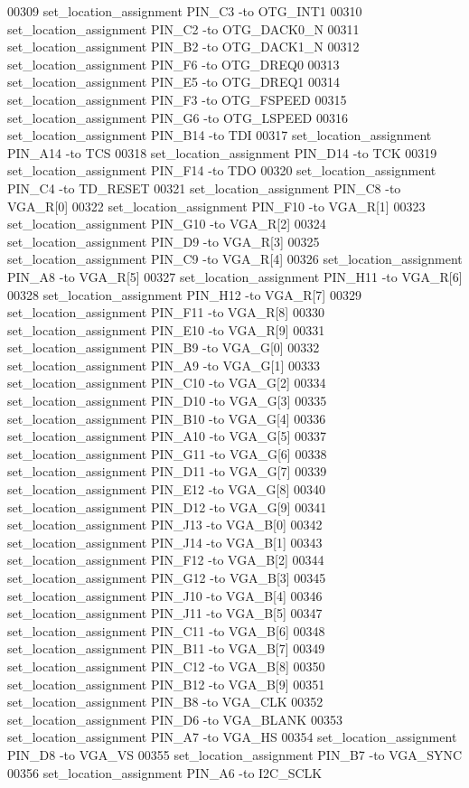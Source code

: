 \begin{DoxyCode}
00309 set\_location\_assignment PIN\_C3 -to OTG\_INT1
00310 set\_location\_assignment PIN\_C2 -to OTG\_DACK0\_N
00311 set\_location\_assignment PIN\_B2 -to OTG\_DACK1\_N
00312 set\_location\_assignment PIN\_F6 -to OTG\_DREQ0
00313 set\_location\_assignment PIN\_E5 -to OTG\_DREQ1
00314 set\_location\_assignment PIN\_F3 -to OTG\_FSPEED
00315 set\_location\_assignment PIN\_G6 -to OTG\_LSPEED
00316 set\_location\_assignment PIN\_B14 -to TDI
00317 set\_location\_assignment PIN\_A14 -to TCS
00318 set\_location\_assignment PIN\_D14 -to TCK
00319 set\_location\_assignment PIN\_F14 -to TDO
00320 set\_location\_assignment PIN\_C4 -to TD\_RESET
00321 set\_location\_assignment PIN\_C8 -to VGA\_R[0]
00322 set\_location\_assignment PIN\_F10 -to VGA\_R[1]
00323 set\_location\_assignment PIN\_G10 -to VGA\_R[2]
00324 set\_location\_assignment PIN\_D9 -to VGA\_R[3]
00325 set\_location\_assignment PIN\_C9 -to VGA\_R[4]
00326 set\_location\_assignment PIN\_A8 -to VGA\_R[5]
00327 set\_location\_assignment PIN\_H11 -to VGA\_R[6]
00328 set\_location\_assignment PIN\_H12 -to VGA\_R[7]
00329 set\_location\_assignment PIN\_F11 -to VGA\_R[8]
00330 set\_location\_assignment PIN\_E10 -to VGA\_R[9]
00331 set\_location\_assignment PIN\_B9 -to VGA\_G[0]
00332 set\_location\_assignment PIN\_A9 -to VGA\_G[1]
00333 set\_location\_assignment PIN\_C10 -to VGA\_G[2]
00334 set\_location\_assignment PIN\_D10 -to VGA\_G[3]
00335 set\_location\_assignment PIN\_B10 -to VGA\_G[4]
00336 set\_location\_assignment PIN\_A10 -to VGA\_G[5]
00337 set\_location\_assignment PIN\_G11 -to VGA\_G[6]
00338 set\_location\_assignment PIN\_D11 -to VGA\_G[7]
00339 set\_location\_assignment PIN\_E12 -to VGA\_G[8]
00340 set\_location\_assignment PIN\_D12 -to VGA\_G[9]
00341 set\_location\_assignment PIN\_J13 -to VGA\_B[0]
00342 set\_location\_assignment PIN\_J14 -to VGA\_B[1]
00343 set\_location\_assignment PIN\_F12 -to VGA\_B[2]
00344 set\_location\_assignment PIN\_G12 -to VGA\_B[3]
00345 set\_location\_assignment PIN\_J10 -to VGA\_B[4]
00346 set\_location\_assignment PIN\_J11 -to VGA\_B[5]
00347 set\_location\_assignment PIN\_C11 -to VGA\_B[6]
00348 set\_location\_assignment PIN\_B11 -to VGA\_B[7]
00349 set\_location\_assignment PIN\_C12 -to VGA\_B[8]
00350 set\_location\_assignment PIN\_B12 -to VGA\_B[9]
00351 set\_location\_assignment PIN\_B8 -to VGA\_CLK
00352 set\_location\_assignment PIN\_D6 -to VGA\_BLANK
00353 set\_location\_assignment PIN\_A7 -to VGA\_HS
00354 set\_location\_assignment PIN\_D8 -to VGA\_VS
00355 set\_location\_assignment PIN\_B7 -to VGA\_SYNC
00356 set\_location\_assignment PIN\_A6 -to I2C\_SCLK

\end{DoxyCode}
